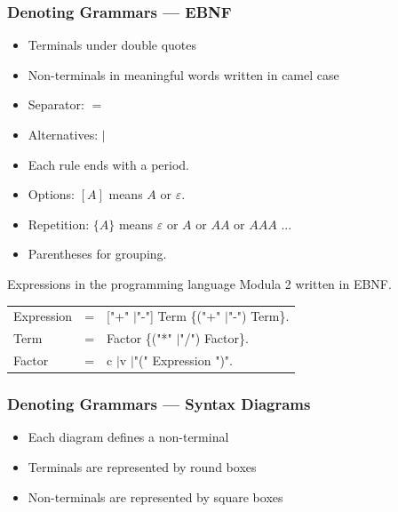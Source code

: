 \documentclass{beamer}
\theoremstyle{remark}
\newcommand{\emptystring}{\varepsilon}
\newenvironment{grammar}
	{\begin{tabular}[b]{lcl}}
	{\end{tabular}}
\newcommand{\alternative}{$\mid$}
\begin{document}
\begin{frame}
	\frametitle{Denoting Grammars --- EBNF}
	\begin {itemize}
		\item Terminals under double quotes
		\item Non-terminals in meaningful words written in camel case
		\item Separator: $=$
		\item Alternatives: $\mid$
		\item Each rule ends with a period.
		\item Options: $[A]$ means $A$ or $\emptystring$.
		\item Repetition: $\{A\}$ means $\emptystring $ or $A$ or $AA$ or $AAA$ ...
		\item Parentheses for grouping.
	\end{itemize}

	\pause
	
	\begin{example}
		Expressions in the programming language Modula 2 written in EBNF.
		
		\begin{grammar}
			Expression & = & ["+" \alternative "-"] Term \{("+" \alternative "-") Term\}. \\
			Term & = & Factor \{("*" \alternative "/") Factor\}. \\
			Factor & = & c \alternative v \alternative "(" Expression ")".
		\end{grammar}
	\end{example}
\end{frame}

\begin{frame}
	\frametitle{Denoting Grammars --- Syntax Diagrams}
	\begin {itemize}
		\item Each diagram defines a non-terminal
		\item Terminals are represented by round boxes
		\item Non-terminals are represented by square boxes
	\end{itemize}
	
\end{frame}
\end{document}
